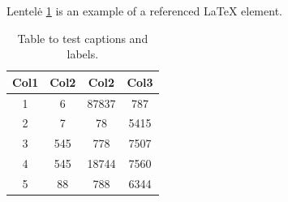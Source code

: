 \documentclass[a4paper, 12pt]{article}
\begin{document}
Lentelė \ref{lentele} is an example of a referenced \LaTeX{} element.

\begin{table}[h!]
\centering
\begin{tabular}{||c c c c||} 
 \hline
 Col1 & Col2 & Col2 & Col3 \\ [0.5ex] 
 \hline\hline
 1 & 6 & 87837 & 787 \\ 
 2 & 7 & 78 & 5415 \\
 3 & 545 & 778 & 7507 \\
 4 & 545 & 18744 & 7560 \\
 5 & 88 & 788 & 6344 \\ [1ex] 
 \hline
\end{tabular}
\caption{Table to test captions and labels.}
\label{lentele}
\end{table}


\newpage
{}

\end{document}

